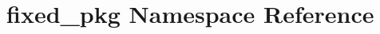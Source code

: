 \hypertarget{namespacefixed__pkg}{}\section{fixed\+\_\+pkg Namespace Reference}
\label{namespacefixed__pkg}

